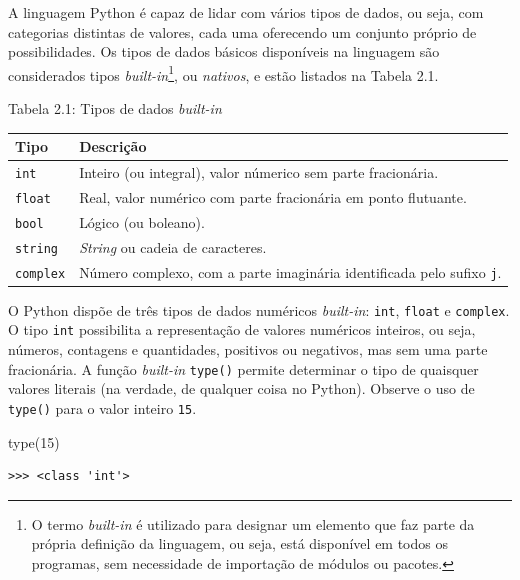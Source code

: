 \documentclass[
]{book}
\newenvironment{Shaded}{\begin{snugshade}}{\end{snugshade}}
\newcommand{\BuiltInTok}[1]{#1}
\newcommand{\DecValTok}[1]{\textcolor[rgb]{0.00,0.00,0.81}{#1}}
\newcommand{\NormalTok}[1]{#1}
\begin{document}
A linguagem Python é capaz de lidar com vários tipos de dados, ou seja, com categorias distintas de valores, cada uma oferecendo um conjunto próprio de possibilidades. Os tipos de dados básicos disponíveis na linguagem são considerados tipos \emph{built-in}\footnote{O termo \emph{built-in} é utilizado para designar um elemento que faz parte da própria definição da linguagem, ou seja, está disponível em todos os programas, sem necessidade de importação de módulos ou pacotes.}, ou \emph{nativos}, e estão listados na Tabela 2.1.

Tabela 2.1: Tipos de dados \emph{built-in}

\begin{longtable}[]{@{}
  >{\raggedright\arraybackslash}p{}
  >{\raggedright\arraybackslash}p{}@{}}
\toprule
Tipo & Descrição \\
\midrule
\endhead
\texttt{int} & Inteiro (ou integral), valor númerico sem parte fracionária. \\
\texttt{float} & Real, valor numérico com parte fracionária em ponto flutuante. \\
\texttt{bool} & Lógico (ou boleano). \\
\texttt{string} & \emph{String} ou cadeia de caracteres. \\
\texttt{complex} & Número complexo, com a parte imaginária identificada pelo sufixo \texttt{j}. \\
\bottomrule
\end{longtable}

O Python dispõe de três tipos de dados numéricos \emph{built-in}: \texttt{int}, \texttt{float} e \texttt{complex}. O tipo \texttt{int} possibilita a representação de valores numéricos inteiros, ou seja, números, contagens e quantidades, positivos ou negativos, mas sem uma parte fracionária. A função \emph{built-in} \texttt{type()} permite determinar o tipo de quaisquer valores literais (na verdade, de qualquer coisa no Python). Observe o uso de \texttt{type()} para o valor inteiro \texttt{15}.

\begin{Shaded}
\begin{Highlighting}[]
\BuiltInTok{type}\NormalTok{(}\DecValTok{15}\NormalTok{)}
\end{Highlighting}
\end{Shaded}

\begin{verbatim}
>>> <class 'int'>
\end{verbatim}
\end{document}
